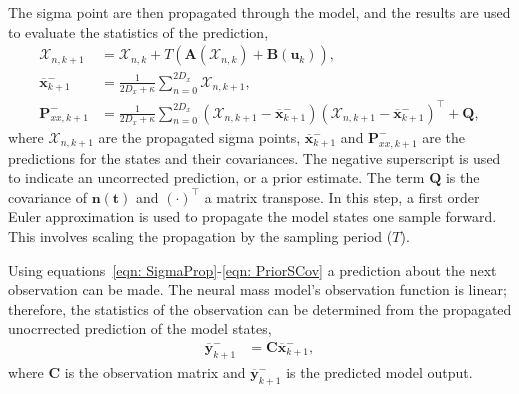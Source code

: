 The sigma point are then propagated through the model, and the results are used to evaluate the statistics of the prediction,
\begin{align}\label{eqn: SigmaProp}%
\mathbf{\mathcal{X}}_{n,k+1} &= \mathbf{\mathcal{X}}_{n,k}+ T(\mathbf{A}(\mathbf{\mathcal{X}}_{n,k}) +\mathbf{B}(\mathbf{u}_{k})),\\
\label{eqn: PriorSMean}
\overline{\mathbf{x}}_{k+1}^{-} &= \frac{1}{2D_{x}+\kappa}\sum_{n=0}^{2D_{x}} \mathbf{\mathcal{X}}_{n,k+1},\\
\label{eqn: PriorSCov}
\mathbf{P}_{xx,k+1}^{-} &= \frac{1}{2D_{x}+\kappa}\sum_{n=0}^{2D_{x}} (\mathbf{\mathcal{X}}_{n,k+1} -\mathbf{\overline{x}}_{k+1}^{-})(\mathbf{\mathcal{X}}_{n,k+1}-\mathbf{\overline{x}}_{k+1}^{-})^{\top} + \mathbf{Q},%
\end{align} where $\mathbf{\mathcal{X}}_{n,k+1}$ are the propagated sigma points, $\overline{\mathbf{x}}_{k+1}^{-}$ and $\mathbf{P}_{xx,k+1}^{-}$ are the predictions for the states and their covariances. The negative superscript is used to indicate an uncorrected prediction, or a prior estimate. The term $\mathbf{Q}$ is the covariance of $\mathbf{n(t)}$ and $(\cdot)^{\top}$ a matrix transpose. In this step, a first order Euler approximation is used to propagate the model states one sample forward. This involves scaling the propagation by the sampling period ($T$). 

Using equations~\ref{eqn: SigmaProp}-\ref{eqn: PriorSCov} a prediction about the next observation can be made. The neural mass model's observation function is linear; therefore, the statistics of the observation can be determined from the propagated unocrrected prediction of the model states,
\begin{align}
\overline{\mathbf{y}}_{k+1}^{-} &= \mathbf{C}\overline{\mathbf{x}}_{k+1}^{-},
\end{align} where $\mathbf{C}$ is the observation matrix and $\overline{\mathbf{y}}_{k+1}^{-}$ is the predicted model output.

